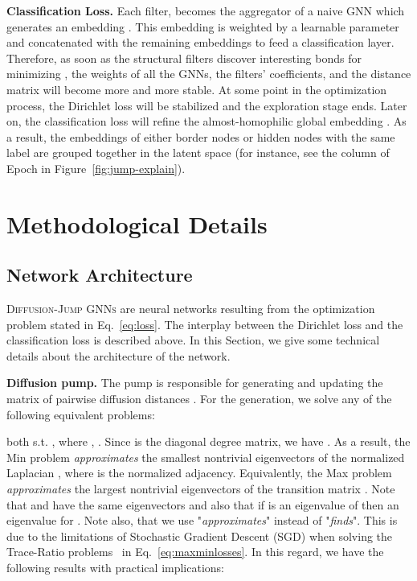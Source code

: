 \documentclass{article}
\theoremstyle{plain}
\theoremstyle{definition}
\begin{document}
\textbf{Classification Loss.} Each filter,  becomes the aggregator of a naive GNN  which generates an embedding . This embedding is weighted by a learnable parameter  and concatenated with the remaining embeddings to feed a classification layer. Therefore, as soon as the structural filters discover interesting bonds for minimizing , the weights  of all the GNNs, the filters' coefficients, and the distance matrix will become more and more stable. At some point in the optimization process, the Dirichlet loss will be stabilized and the exploration stage ends. Later on, the classification loss will refine the almost-homophilic global embedding .
As a result, the embeddings of either border nodes or hidden nodes with the same label are grouped together in the latent space (for instance, see the column of Epoch  in Figure~\ref{fig:jump-explain}).







                                                              


\section{Methodological Details}\label{sec:4}
\subsection{Network Architecture}
\textsc{Diffusion-Jump GNNs} are neural networks  resulting from the optimization problem stated in Eq.~\ref{eq:loss}.  
The interplay between the Dirichlet loss and the classification loss is described above. In this Section,  we give some technical details about the architecture of the network. 

\textbf{Diffusion pump.} The pump is responsible for generating and updating the matrix of pairwise diffusion distances . For the generation, we solve any of the following equivalent problems: 

both s.t. , where , . Since  is the diagonal degree matrix, we have . 
As a result, the Min problem \emph{approximates} the  smallest nontrivial eigenvectors of the normalized Laplacian , where  is the normalized adjacency. Equivalently, the Max problem \emph{approximates} the  largest nontrivial
eigenvectors of the transition matrix . Note that  and  have the same eigenvectors and also that if  is an eigenvalue of  then  an eigenvalue for . Note also, that we use "\emph{approximates}" instead of "\emph{finds}". This is due to the limitations of Stochastic Gradient Descent (SGD) when solving the Trace-Ratio problems~\citep{TraceRatio07}\citep{TraceRatio09}\citep{TraceRatio12} in Eq.~\ref{eq:maxminlosses}. In this regard, we have the following results with practical implications:
\end{document}
